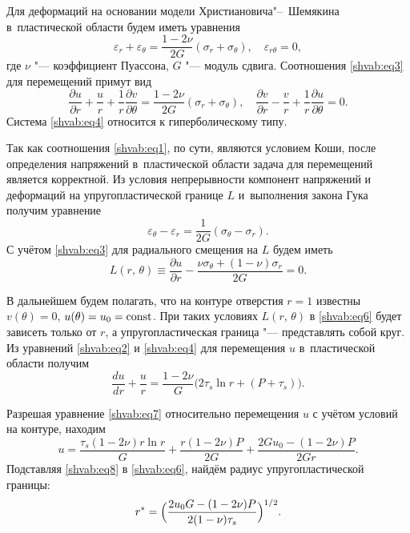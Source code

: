 Для деформаций на основании модели Христиановича"--~Шемякина \cite{shvab:bib2} \linebreak в~пластической
области будем иметь уравнения
\begin{equation}
\label{shvab:eq3}
\varepsilon_r +\varepsilon_\theta =\frac{1-2\nu}{2G} (\sigma_r + \sigma _\theta), \quad 
\varepsilon_{r\theta } =0,
\end{equation}
где $\nu $ "--- коэффициент Пуассона, $G$ "--- модуль сдвига.
Соотношения \eqref{shvab:eq3} для перемещений примут вид
\begin{equation}
\label{shvab:eq4}
\frac{\partial u}{\partial r}+\frac{u}{r}+\frac{1}{r}\frac{\partial
v }{\partial \theta }=\frac{1-2\nu }{2G}(\sigma _r +\sigma_\theta ), \quad 
\frac{\partial v }{\partial r}-\frac{v
}{r}+\frac{1}{r}\frac{\partial u}{\partial \theta }=0.
\end{equation}
Система \eqref{shvab:eq4} относится к гиперболическому типу. 

Так как соотношения \eqref{shvab:eq1}, по сути, являются условием Коши, после определения напряжений в~пластической области задача для перемещений является корректной. 
Из условия непрерывности компонент напряжений и деформаций на упругопластической границе $L$ и~выполнения закона Гука получим уравнение
\begin{equation}
\label{shvab:eq5}
\varepsilon _\theta -\varepsilon _r =\frac{1}{2G}(\sigma _\theta -\sigma _r).
\end{equation}
С учётом \eqref{shvab:eq3} для радиального смещения на $L$ будем иметь
\begin{equation}
\label{shvab:eq6}
L(r,\,\theta)\equiv \frac{\partial u}{\partial r}-\frac{\nu
\sigma _\theta +( 1-\nu )\sigma _r }{2G}=0.
\end{equation}

В дальнейшем будем полагать, что на контуре отверстия $r=1$ известны $v (\theta)=0$, $u (\theta) =u_0  ={\rm const}$.
При таких условиях  $L(r,\,\theta )$ в \eqref{shvab:eq6}  будет зависеть только от $r$, а упругопластическая граница "--- представлять собой круг. 
Из уравнений \eqref{shvab:eq2} и \eqref{shvab:eq4} для перемещения $u$ в~пластической области получим 
\begin{equation}
\label{shvab:eq7}
\frac{du}{dr}+\frac{u}{r}=\frac{1-2\nu }{G}\bigl(2\tau _s \ln r+ (P+\tau _s)\bigr).
\end{equation}

Разрешая уравнение \eqref{shvab:eq7} относительно перемещения $u$ с учётом условий на контуре, находим
\begin{equation}
\label{shvab:eq8}
u=\frac{\tau _s (1-2\nu )r\ln r}{G}+\frac{r(1-2\nu)P}{2G}+\frac{2Gu_0 - (1-2\nu)P}{2Gr}.
\end{equation}
Подставляя \eqref{shvab:eq8} в \eqref{shvab:eq6}, найдём радиус упругопластической границы:
\begin{equation}
\label{shvab:eq9}
r^\ast =\Bigl( \frac{2u_0 G-( 1-2\nu )P}{2 (1-\nu)\tau _s }\Bigr)^{{1}/{2}}.
\end{equation}

